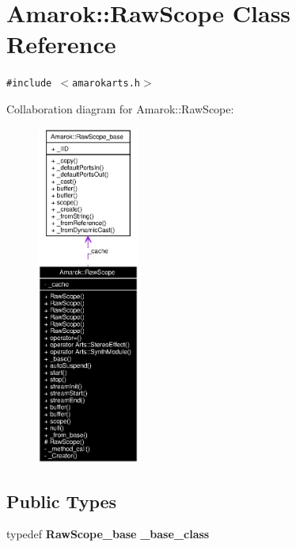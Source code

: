 \section{Amarok::Raw\-Scope Class Reference}
\label{classAmarok_1_1RawScope}
{\tt \#include $<$amarokarts.h$>$}

Collaboration diagram for Amarok::Raw\-Scope:\begin{figure}[H]
\begin{center}
\leavevmode
\includegraphics[width=95pt]{classAmarok_1_1RawScope__coll__graph}
\end{center}
\end{figure}
\subsection*{Public Types}
\begin{CompactItemize}
\item 
typedef {\bf Raw\-Scope\_\-base} {\bf \_\-base\_\-class}
\end{CompactItemize}
